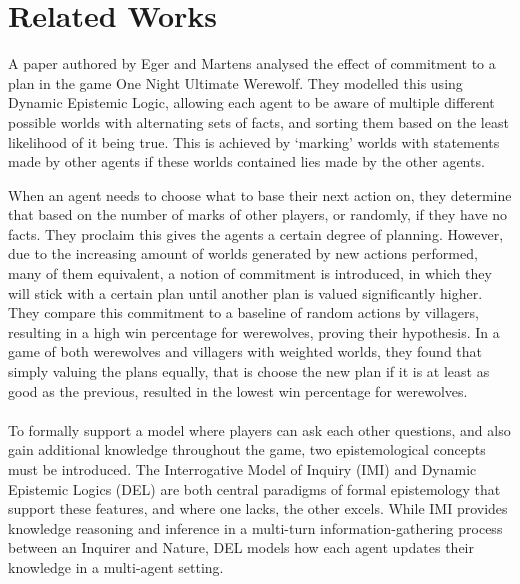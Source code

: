 \section{Related Works}
A paper authored by Eger and Martens\cite{commitment} analysed the effect of
commitment to a plan in the game One Night Ultimate Werewolf. They modelled
this using Dynamic Epistemic Logic, allowing each agent to be aware of multiple
different possible worlds with alternating sets of facts, and sorting them
based on the least likelihood of it being true. This is achieved by ‘marking’
worlds with statements made by other agents if these worlds contained lies made
by the other agents.

When an agent needs to choose what to base their next action on, they determine
that based on the number of marks of other players, or randomly, if they have
no facts. They proclaim this gives the agents a certain degree of planning.
However, due to the increasing amount of worlds generated by new actions
performed, many of them equivalent, a notion of commitment is introduced, in
which they will stick with a certain plan until another plan is valued
significantly higher. They compare this commitment to a baseline of random
actions by villagers, resulting in a high win percentage for werewolves,
proving their hypothesis. In a game of both werewolves and villagers with
weighted worlds, they found that simply valuing the plans equally, that is
choose the new plan if it is at least as good as the previous, resulted in the
lowest win percentage for werewolves.\\ \\ To formally support a model where
players can ask each other questions, and also gain additional knowledge
throughout the game, two epistemological concepts must be introduced. The
Interrogative Model of Inquiry (IMI) and Dynamic Epistemic Logics (DEL) are
both central paradigms of formal epistemology that support these features, and
where one lacks, the other excels. While IMI provides knowledge reasoning and
inference in a multi-turn information-gathering process between an Inquirer and
Nature, DEL models how each agent updates their knowledge in a multi-agent
setting.

